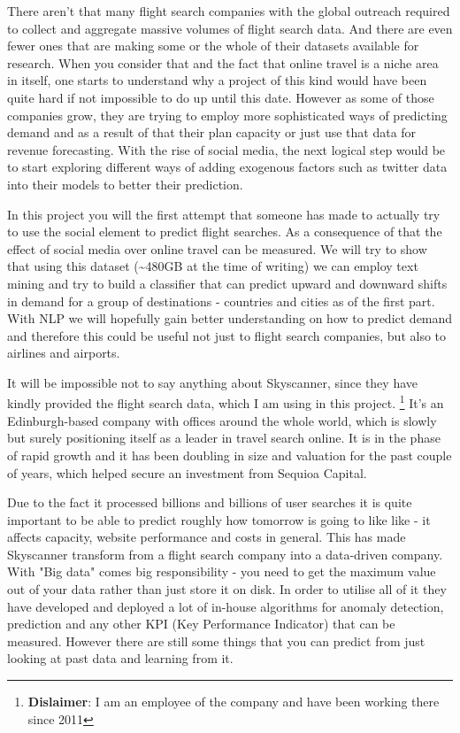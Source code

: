 \documentclass[minf,frontabs,twoside,singlespacing,parskip]{infthesis}
\begin{document}
There aren't that many flight search companies with the global outreach required to collect and aggregate massive volumes of flight search data. And there are even fewer ones that are making some or the whole of their datasets available for research. When you consider that and the fact that online travel is a niche area in itself, one starts to understand why a project of this kind would have been quite hard if not impossible to do up until this date. However as some of those companies grow, they are trying to employ more sophisticated ways of predicting demand and as a result of that their plan capacity or just use that data for revenue forecasting. With the rise of social media, the next logical step would be to start exploring different ways of adding exogenous factors such as twitter data into their models to better their prediction. 


In this project you will the first attempt that someone has made to actually try to use the social element to predict flight searches. As a consequence of that the effect of social media over online travel can be measured. We will try to show that using this dataset (\textasciitilde 480GB at the time of writing) we can employ text mining and try to build a classifier that can predict upward and downward shifts in demand for a group of destinations - countries and cities as of the first part. With NLP we will hopefully gain better understanding on how to predict demand and therefore this could be useful not just to flight search companies, but also to airlines and airports. 


It will be impossible not to say anything about Skyscanner, since they have kindly provided the flight search data, which I am using in this project. \footnote{\textbf{Dislaimer}: I am an employee of the company and have been working there since 2011} It's an Edinburgh-based company with offices around the whole world, which is slowly but surely positioning itself as a leader in travel search online. It is in the phase of rapid growth and it has been doubling in size and valuation for the past couple of years, which helped secure an investment from Sequioa Capital. \cite{seqcap}


Due to the fact it processed billions and billions of user searches it is quite important to be able to predict roughly how tomorrow is going to like like - it affects capacity, website performance and costs in general. This has made Skyscanner transform from a flight search company into a data-driven company. With "Big data" comes big responsibility - you need to get the maximum value out of your data rather than just store it on disk. In order to utilise all of it they have developed and deployed a lot of in-house algorithms for anomaly detection, prediction and any other KPI (Key Performance Indicator) that can be measured. However there are still some things that you can predict from just looking at past data and learning from it.
\end{document}
